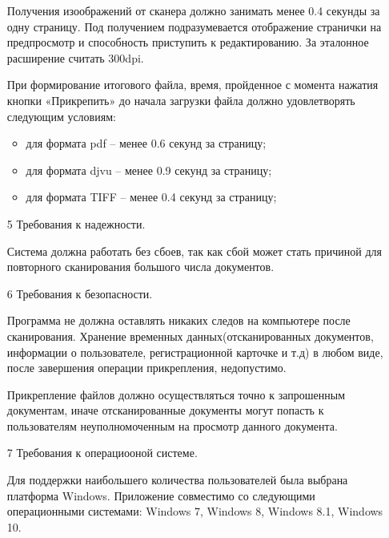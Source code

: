 \begin{itemize}
\hspace*{2.5em}Получения изоображений от сканера должно занимать менее 0.4 секунды за одну страницу. Под получением подразумевается отображение странички на предпросмотр и способность приступить к редактированию. За эталонное расширение считать 300dpi.

\hspace*{2.5em}При формирование итогового файла, время, пройденное с момента нажатия кнопки «Прикрепить» до начала загрузки файла должно удовлетворять следующим условиям:
	\begin{itemize}
		\item для формата pdf – менее 0.6 секунд за страницу;
		\item для формата djvu – менее 0.9 секунд за страницу;
		\item для формата TIFF – менее 0.4 секунд за страницу;
	\end{itemize}
  \item[5] Требования к надежности.

\hspace*{2.5em}Система должна работать без сбоев, так как сбой может стать причиной для повторного сканирования большого числа документов.

  \item[6] Требования к безопасности.

\hspace*{2.5em}Программа не должна оставлять никаких следов на компьютере после сканирования. Хранение временных данных(отсканированных документов, информации о пользователе, регистрационной карточке и т.д) в любом виде, после завершения операции прикрепления, недопустимо.

\hspace*{2.5em}Прикрепление файлов должно осуществляться точно к запрошенным документам, иначе отсканированные документы  могут попасть к пользователям неуполномоченным на просмотр данного документа.
  
  \item[7] Требования к операциооной системе.

\hspace*{2.5em}Для поддержки наибольшего количества пользователей была выбрана платформа Windows. Приложение совместимо со следующими операционными системами: Windows 7, Windows 8, Windows 8.1, Windows 10.

\end{itemize}